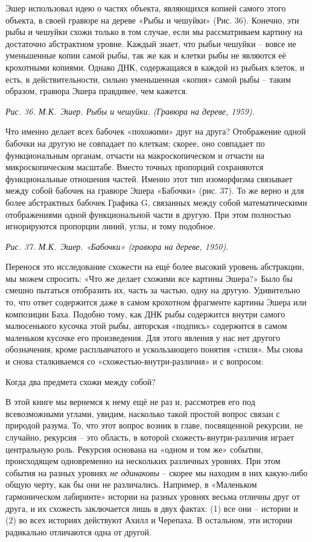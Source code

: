 \documentclass[../main.tex]{subfiles}
\begin{document}
Эшер использовал идею о частях объекта, являющихся копией самого этого объекта, в своей гравюре на дереве «Рыбы и чешуйки» (Рис. 36). Конечно, эти рыбы и чешуйки схожи только в том случае, если мы рассматриваем картину на достаточно абстрактном уровне. Каждый знает, что рыбьи чешуйки \--- вовсе не уменьшенные копии самой рыбы, так же как и клетки рыбы не являются её крохотными копиями. Однако ДНК, содержащаяся в каждой из рыбьих клеток, и есть, в действительности, сильно уменьшенная «копия» самой рыбы \--- таким образом, гравюра Эшера правдивее, чем кажется.

\emph{Рис. 36. М.К.~Эшер. Рыбы и чешуйки. (Гравюра на дереве, 1959).}

Что именно делает всех бабочек «похожими» друг на друга? Отображение одной бабочки на другую не совпадает по клеткам; скорее, оно совпадает по функциональным органам, отчасти на макроскопическом и отчасти на микроскопическом масштабе. Вместо точных пропорций сохраняются функциональные отношения частей. Именно этот тип изоморфизма связывает между собой бабочек на гравюре Эшера «Бабочки» (рис. 37). То же верно и для более абстрактных бабочек Графика G, связанных между собой математическими отображениями одной функциональной части в другую. При этом полностью игнорируются пропорции линий, углы, и тому подобное.

\emph{Рис. 37. М.К.~Эшер. «Бабочки» (гравюра на дереве, 1950).}

Перенося это исследование схожести на ещё более высокий уровень абстракции, мы можем спросить: «Что же делает схожими все картины Эшера?» Было бы смешно пытаться отобразить их, часть за частью, одну на другую. Удивительно то, что ответ содержится даже в самом крохотном фрагменте картины Эшера или композиции Баха. Подобно тому, как ДНК рыбы содержится внутри самого малюсенького кусочка этой рыбы, авторская «подпись» содержится в самом маленьком кусочке его произведения. Для этого явления у нас нет другого обозначения, кроме расплывчатого и ускользающего понятия «стиля». Мы снова и снова сталкиваемся со «схожестью-внутри-различия» и с вопросом:

Когда два предмета схожи между собой?

В этой книге мы вернемся к нему ещё не раз и, рассмотрев его под всевозможными углами, увидим, насколько такой простой вопрос связан с природой разума. То, что этот вопрос возник в главе, посвященной рекурсии, не случайно, рекурсия \--- это область, в которой схожесть-внутри-различия играет центральную роль. Рекурсия основана на «одном и том же» событии, происходящем одновременно на нескольких различных уровнях. При этом события на разных уровнях \emph{не одинаковы} \--- скорее мы находим в них какую-либо общую черту, как бы они не различались. Например, в «Маленьком гармоническом лабиринте» истории на разных уровнях весьма отличны друг от друга, и их схожесть заключается лишь в двух фактах: (1) все они \--- истории и (2) во всех историях действуют Ахилл и Черепаха. В остальном, эти истории радикально отличаются одна от другой.
\end{document}
